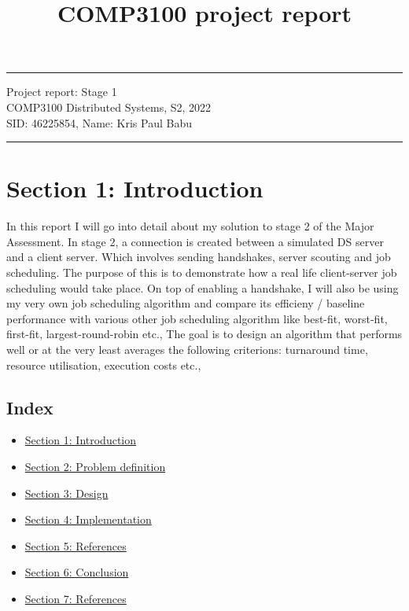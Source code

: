 \documentclass[a4paper]{article} %
\begin{document}

\title{COMP3100 project report} %
\fancyhead[C]{}
\hrule \medskip %
\begin{minipage}{1\textwidth} %
\centering 
\large %
Project report: Stage 1\\ %
COMP3100 Distributed Systems, S2, 2022\\
\normalsize %
SID: 46225854, Name: Kris Paul Babu
\end{minipage}
\medskip\hrule %
\bigskip

\section*{Section 1: Introduction}
\label{sec:section1}
In this report I will go into detail about my solution to stage 2 of the Major Assessment. In stage 2,  
a connection is created between a simulated DS server and a client server. Which involves sending handshakes, 
server scouting and job scheduling. The purpose of this is to demonstrate how a real life client-server 
job scheduling would take place. On top of enabling a handshake, I will also be using my very own job scheduling algorithm 
and compare its efficieny / baseline performance with various other job scheduling algorithm like best-fit, worst-fit, 
first-fit, largest-round-robin etc., The goal is to design an algorithm that performs well or at the very least averages 
the following criterions: turnaround time, resource utilisation, execution costs etc., 



\subsection*{Index}
\begin{itemize}
    \item \hyperref[sec:section1]{Section 1: Introduction}
    \item \hyperref[sec:section2]{Section 2: Problem definition}
    \item \hyperref[sec:section3]{Section 3: Design}
    \item \hyperref[sec:section4]{Section 4: Implementation}
    \item \hyperref[sec:section5]{Section 5: References}
    \item \hyperref[sec:section6]{Section 6: Conclusion}
    \item \hyperref[sec:section7]{Section 7: References}
\end{itemize}
\end{document}
